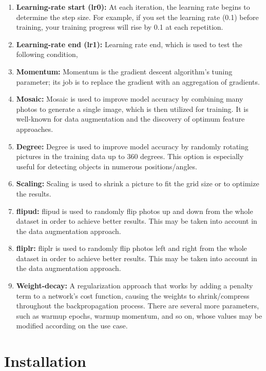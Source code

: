 \begin{enumerate}
	
	\item \textbf{Learning-rate start (lr0): } At each iteration, the learning rate begins to determine the step size. For example, if you set the learning rate (0.1) before training, your training progress will rise by 0.1 at each repetition.
	\item \textbf{Learning-rate end (lr1):} Learning rate end, which is used to test the following condition,
	\item \textbf{Momentum:} Momentum is the gradient descent algorithm's tuning parameter; its job is to replace the gradient with an aggregation of gradients.
	\item \textbf{Mosaic:} Mosaic is used to improve model accuracy by combining many photos to generate a single image, which is then utilized for training. It is well-known for data augmentation and the discovery of optimum feature approaches.
	\item \textbf{Degree:} Degree is used to improve model accuracy by randomly rotating pictures in the training data up to 360 degrees. This option is especially useful for detecting objects in numerous positions/angles. 
	\item \textbf{Scaling:} Scaling is used to shrink a picture to fit the grid size or to optimize the results. 
	\item \textbf{flipud:} flipud is used to randomly flip photos up and down from the whole dataset in order to achieve better results. This may be taken into account in the data augmentation approach. 
	\item \textbf{fliplr:} fliplr is used to randomly flip photos left and right from the whole dataset in order to achieve better results. This may be taken into account in the data augmentation approach.
	\item \textbf{Weight-decay:} A regularization approach that works by adding a penalty term to a network's cost function, causing the weights to shrink/compress throughout the backpropagation process. 
	There are several more parameters, such as warmup epochs, warmup momentum, and so on, whose values may be modified according on the use case.
\end{enumerate}

\section{Installation}


